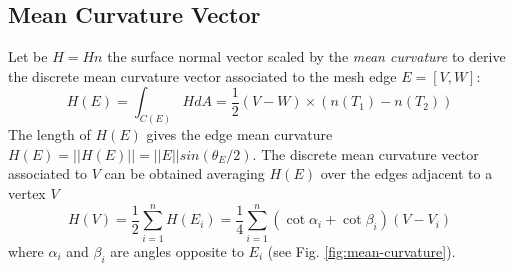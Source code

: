 \subsection{Mean Curvature Vector}
Let be $H = H n$ the surface normal vector scaled by the \textit{mean curvature} to derive the discrete mean curvature vector associated to the mesh edge $E=[V, W]$:
$$ H(E) = \int_{C(E)} HdA = \frac{1}{2} (V-W) \times (n(T_1) - n(T_2))$$
The length of $H(E)$ gives the edge mean curvature $H(E) = ||H(E) || = ||E|| sin(\theta_E/2)$. The discrete mean curvature vector associated to $V$ can be obtained averaging $H(E)$ over the edges adjacent to a vertex $V$
$$H(V) = \frac{1}{2} \sum_{i=1}^{n} H(E_i) = \frac{1}{4}\sum_{i=1}^n (\cot \alpha_i + \cot \beta_i)(V - V_i)$$
where $\alpha_i$ and $\beta_i$ are angles opposite to $E_i$ (see Fig. \ref{fig:mean-curvature}).
\cite{geometryprocessing}

